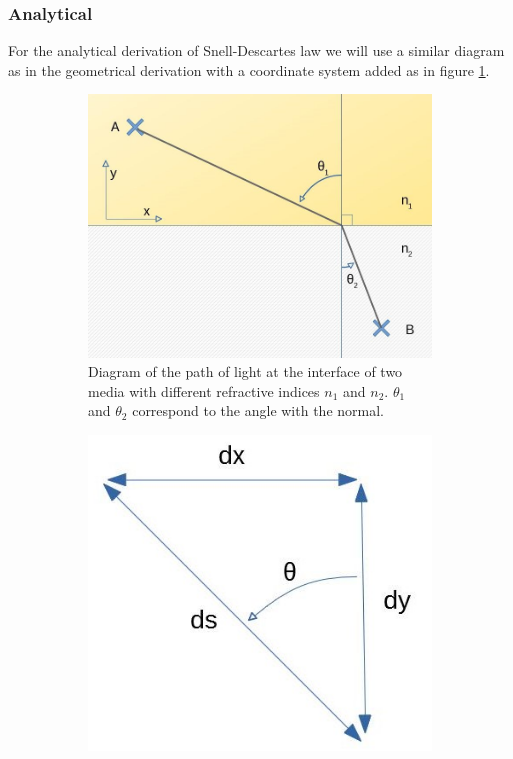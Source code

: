 \documentclass{article}
\begin{document}
 \newpage

\subsubsection{Analytical}

For the analytical derivation of Snell-Descartes law we will use a similar diagram as in the geometrical derivation with a coordinate system added as in figure \ref{fig_snell_analytical}.

\begin{figure}[h!]
\centering
  \begin{subfigure}[b]{0.3\textwidth}
    \includegraphics[width=\textwidth]{afbeeldingen/snell_analytical.jpg}
	\caption{Diagram of the path of light at the interface of two media with different refractive indices $n_1$ and $n_2$. $\theta _1$ and $\theta _2$ correspond to the angle with the normal.}
	\label{fig_snell_analytical}
  \end{subfigure}
  \hspace{0.1\textwidth}
  \begin{subfigure}[b]{0.2\textwidth}
    \includegraphics[width=\textwidth]{afbeeldingen/ds.jpg}

\end{subfigure}
\end{figure}
\end{document}
